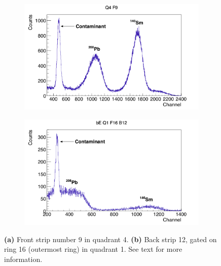 \documentclass[twoside,english]{uiofysmaster/uiofysmaster}
\begin{document}
\begin{figure}[ht]
	\centering
	\begin{subfigure}[t]{0.49\textwidth}
		\centering
		\includegraphics[width=\textwidth]{../Plots/plotting/TB_Q4_F9.png}
		\caption{}
		\label{fig:CD_cal_easy}
	\end{subfigure}
	\hfill
	\begin{subfigure}[t]{0.49\textwidth}
		\centering
		\includegraphics[width=\textwidth]{../Plots/plotting/bE_Q1_f16_b12.png}
		\caption{}
		\label{fig:CD_cal_difficult}
	\end{subfigure}
	\caption{\textbf{(a)} Front strip number 9 in quadrant 4. 
	\textbf{(b)} Back strip 12, gated on ring 16 (outermost ring) in quadrant 1. 
	See text for more information.}
	\label{fig:cal_ED}
\end{figure}
\end{document}
